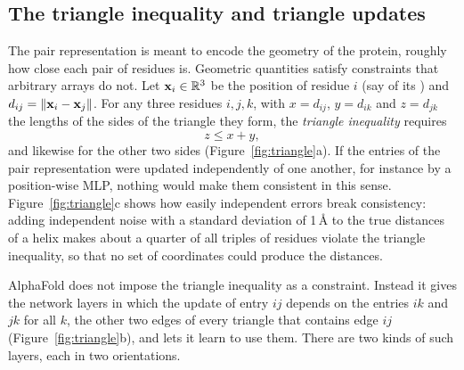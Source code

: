 \subsection{The triangle inequality and triangle updates}

The pair representation is meant to encode the geometry of the protein, roughly how close each pair of residues is. Geometric quantities satisfy constraints that arbitrary arrays do not. Let $\mathbf{x}_i\in\mathbb{R}^3$ be the position of residue $i$ (say of its \Ca) and $d_{ij}=\|\mathbf{x}_i-\mathbf{x}_j\|$. For any three residues $i,j,k$, with $x=d_{ij}$, $y=d_{ik}$ and $z=d_{jk}$ the lengths of the sides of the triangle they form, the \emph{triangle inequality} requires
\begin{equation}
  z \leq x + y ,
\end{equation}
and likewise for the other two sides (Figure~\ref{fig:triangle}a). If the entries of the pair representation were updated independently of one another, for instance by a position-wise MLP, nothing would make them consistent in this sense. Figure~\ref{fig:triangle}c shows how easily independent errors break consistency: adding independent noise with a standard deviation of 1\,\AA{} to the true \Ca{} distances of a helix makes about a quarter of all triples of residues violate the triangle inequality, so that no set of coordinates could produce the distances.

AlphaFold does not impose the triangle inequality as a constraint. Instead it gives the network layers in which the update of entry $ij$ depends on the entries $ik$ and $jk$ for all $k$, the other two edges of every triangle that contains edge $ij$ (Figure~\ref{fig:triangle}b), and lets it learn to use them. There are two kinds of such layers, each in two orientations.

